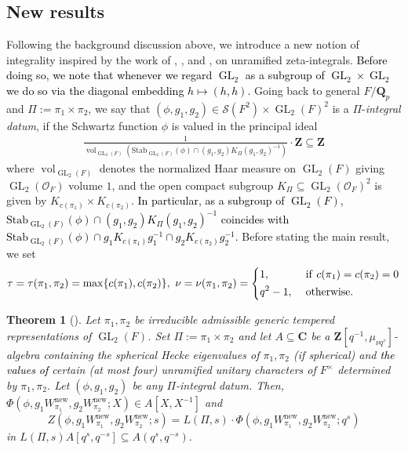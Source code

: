 \documentclass{amsart}
\theoremstyle{plain}
\newtheorem{theorem}{Theorem}
\theoremstyle{plain}
\theoremstyle{remark}
\DeclareMathOperator{\GL}{GL}
\DeclareMathOperator{\vol}{vol}
\begin{document}
\subsection{New results}
Following the background discussion above, we introduce a new notion of integrality inspired by the work of \cite{Loeffler_2021}, \cite{loeffler2021zetaintegralsunramifiedrepresentationsgsp4}, and \cite{groutides2024rankinselbergintegralstructureseuler}, on unramified zeta-integrals. \textcolor{black}{Before doing so, we note that whenever we regard $\GL_2$ as a subgroup of $\GL_2\times \GL_2$ we do so via the diagonal embedding $h\mapsto(h,h)$.} Going back to general $F/\mathbf{Q}_p$ and $\Pi:=\pi_1\times\pi_2$, we say that $(\phi,g_1,g_2)\in\mathcal{S}(F^2)\times \GL_2(F)^2$ is a $\Pi$-\textit{integral datum}, if the Schwartz function $\phi$ is valued in the principal ideal
\begin{align}\label{eq: intro integral}\frac{1}{\vol_{\GL_2(F)}(\mathrm{Stab}_{\GL_2(F)}(\phi)\cap (g_1,g_2)K_\Pi(g_1,g_2)^{-1})}\cdot \mathbf{Z}\subseteq\mathbf{Z}\end{align}
where $\vol_{\GL_2(F)}$ denotes the normalized Haar measure on $\GL_2(F)$ giving $\GL_2(\mathcal{O}_F)$ volume $1$, and the open compact subgroup $K_\Pi\subseteq\GL_2(\mathcal{O}_F)^2$ is given by $K_{c(\pi_1)}\times K_{c(\pi_2)}$. \textcolor{black}{In particular, as a subgroup of $\GL_2(F)$, $\mathrm{Stab}_{\GL_2(F)}(\phi)\cap (g_1,g_2)K_\Pi(g_1,g_2)^{-1}$ coincides with $\mathrm{Stab}_{\GL_2(F)}(\phi)\cap g_1K_{c(\pi_1)}g_1^{-1}\cap g_2 K_{c(\pi_2)}g_2^{-1}.$ } Before stating the main result, we set 
$$\tau=\tau(\pi_1,\pi_2)=\max\{c(\pi_1),c(\pi_2)\},\ \nu=\nu(\pi_1,\pi_2)=\begin{dcases}
    1,\ &\mathrm{if}\ c(\pi_1)=c(\pi_2)=0\\
    q^2-1,\ &\mathrm{otherwise.}
\end{dcases}$$
\begin{theorem}[]\label{thm: intro A}
    Let $\pi_1,\pi_2$ be irreducible admissible generic tempered representations of $\GL_2(F)$. Set $\Pi:=\pi_1\times\pi_2$ and let $A\subseteq\mathbf{C}$ be a $\mathbf{Z}[q^{-1},\mu_{\nu q^\tau}]$-algebra containing the spherical Hecke eigenvalues of $\pi_1,\pi_2$ \emph{(}if spherical\emph{)} and \textcolor{black}{the values of} certain \emph{(}at most four\emph{)} unramified unitary characters of $F^\times$ determined by $\pi_1,\pi_2$. Let $(\phi,g_1,g_2)$ be any $\Pi$-integral datum. Then,  $\Phi(\phi,g_1W_{\pi_1}^\mathrm{new},g_2W_{\pi_2}^\mathrm{new};X)\in A[X,X^{-1}]$ and
    $$Z(\phi,g_1W_{\pi_1}^\mathrm{new},g_2W_{\pi_2}^\mathrm{new};s)=L(\Pi,s)\cdot \Phi(\phi,g_1W_{\pi_1}^\mathrm{new},g_2W_{\pi_2}^\mathrm{new};q^s)$$
    in $L(\Pi,s)A[q^s,q^{-s}]\subseteq A(q^s,q^{-s}).$
    
\end{theorem}
\end{document}
